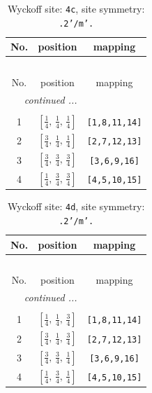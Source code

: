 \documentclass[fleqn,8pt]{jsarticle}
\begin{document}
\renewcommand{\arraystretch}{1.2}
\begin{longtable}{ccc}
\caption{Wyckoff site: {\tt 4c}, site symmetry: {\tt .2'/m'.}}
 \\
 \hline \hline
No. & position & mapping \\ \hline \endfirsthead

\multicolumn{2}{l}{\tablename\ \thetable{}} \\
 \hline \hline
No. & position & mapping \\ \hline \endhead

 \hline \hline
\multicolumn{2}{r}{\footnotesize\it continued ...} \\ \endfoot

 \hline \hline
\multicolumn{2}{r}{} \\ \endlastfoot

1 & $\left[ \frac{1}{4},\, \frac{1}{4},\, \frac{1}{4} \right]$ & {\tt [1,8,11,14]} \\ \hline
2 & $\left[ \frac{3}{4},\, \frac{1}{4},\, \frac{1}{4} \right]$ & {\tt [2,7,12,13]} \\ \hline
3 & $\left[ \frac{3}{4},\, \frac{3}{4},\, \frac{3}{4} \right]$ & {\tt [3,6,9,16]} \\ \hline
4 & $\left[ \frac{1}{4},\, \frac{3}{4},\, \frac{3}{4} \right]$ & {\tt [4,5,10,15]} \\
\end{longtable}
\renewcommand{\arraystretch}{1.2}
\begin{longtable}{ccc}
\caption{Wyckoff site: {\tt 4d}, site symmetry: {\tt .2'/m'.}}
 \\
 \hline \hline
No. & position & mapping \\ \hline \endfirsthead

\multicolumn{2}{l}{\tablename\ \thetable{}} \\
 \hline \hline
No. & position & mapping \\ \hline \endhead

 \hline \hline
\multicolumn{2}{r}{\footnotesize\it continued ...} \\ \endfoot

 \hline \hline
\multicolumn{2}{r}{} \\ \endlastfoot

1 & $\left[ \frac{1}{4},\, \frac{1}{4},\, \frac{3}{4} \right]$ & {\tt [1,8,11,14]} \\ \hline
2 & $\left[ \frac{3}{4},\, \frac{1}{4},\, \frac{3}{4} \right]$ & {\tt [2,7,12,13]} \\ \hline
3 & $\left[ \frac{3}{4},\, \frac{3}{4},\, \frac{1}{4} \right]$ & {\tt [3,6,9,16]} \\ \hline
4 & $\left[ \frac{1}{4},\, \frac{3}{4},\, \frac{1}{4} \right]$ & {\tt [4,5,10,15]} \\
\end{longtable}
\end{document}

